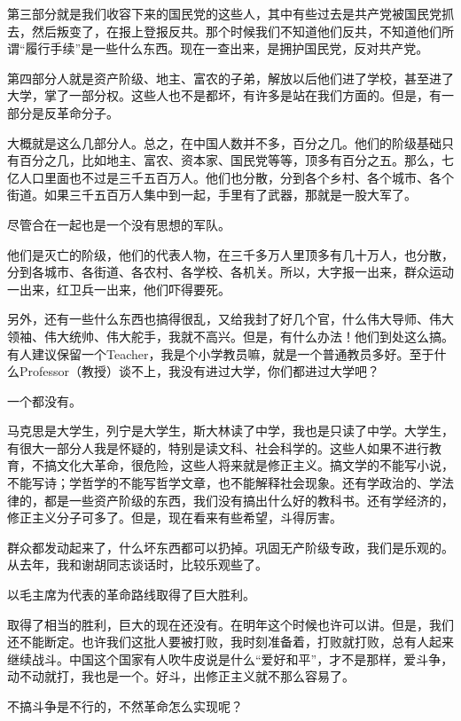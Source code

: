 第三部分就是我们收容下来的国民党的这些人，其中有些过去是共产党被国民党抓去，然后叛变了，在报上登报反共。那个时候我们不知道他们反共，不知道他们所谓“履行手续”是一些什么东西。现在一查出来，是拥护国民党，反对共产党。

第四部分人就是资产阶级、地主、富农的子弟，解放以后他们进了学校，甚至进了大学，掌了一部分权。这些人也不是都坏，有许多是站在我们方面的。但是，有一部分是反革命分子。

大概就是这么几部分人。总之，在中国人数并不多，百分之几。他们的阶级基础只有百分之几，比如地主、富农、资本家、国民党等等，顶多有百分之五。那么，七亿人口里面也不过是三千五百万人。他们也分散，分到各个乡村、各个城市、各个街道。如果三千五百万人集中到一起，手里有了武器，那就是一股大军了。

尽管合在一起也是一个没有思想的军队。

他们是灭亡的阶级，他们的代表人物，在三千多万人里顶多有几十万人，也分散，分到各城市、各街道、各农村、各学校、各机关。所以，大字报一出来，群众运动一出来，红卫兵一出来，他们吓得要死。

另外，还有一些什么东西也搞得很乱，又给我封了好几个官，什么伟大导师、伟大领袖、伟大统帅、伟大舵手，我就不高兴。但是，有什么办法！他们到处这么搞。有人建议保留一个Teacher，我是个小学教员嘛，就是一个普通教员多好。至于什么Professor（教授）谈不上，我没有进过大学，你们都进过大学吧？

一个都没有。

马克思是大学生，列宁是大学生，斯大林读了中学，我也是只读了中学。大学生，有很大一部分人我是怀疑的，特别是读文科、社会科学的。这些人如果不进行教育，不搞文化大革命，很危险，这些人将来就是修正主义。搞文学的不能写小说，不能写诗；学哲学的不能写哲学文章，也不能解释社会现象。还有学政治的、学法律的，都是一些资产阶级的东西，我们没有搞出什么好的教科书。还有学经济的，修正主义分子可多了。但是，现在看来有些希望，斗得厉害。

群众都发动起来了，什么坏东西都可以扔掉。巩固无产阶级专政，我们是乐观的。从去年，我和谢胡同志谈话时，比较乐观些了。

以毛主席为代表的革命路线取得了巨大胜利。

取得了相当的胜利，巨大的现在还没有。在明年这个时候也许可以讲。但是，我们还不能断定。也许我们这批人要被打败，我时刻准备着，打败就打败，总有人起来继续战斗。中国这个国家有人吹牛皮说是什么“爱好和平”，才不是那样，爱斗争，动不动就打，我也是一个。好斗，出修正主义就不那么容易了。

不搞斗争是不行的，不然革命怎么实现呢？

